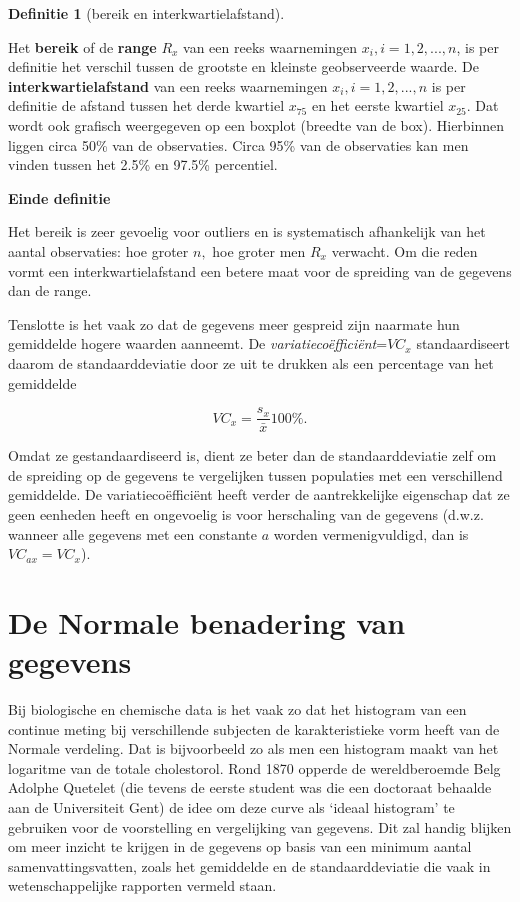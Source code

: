 \documentclass[
  12pt,dutch,coursenotes]{book}
\theoremstyle{definition}
\newtheorem{definition}{Definitie}[chapter]
\theoremstyle{definition}
\theoremstyle{definition}
\theoremstyle{definition}
\theoremstyle{remark}
\begin{document}
\begin{definition}[bereik en interkwartielafstand]
\protect\hypertarget{def:unnamed-chunk-103}{}{\label{def:unnamed-chunk-103} {} }
\end{definition}
Het \textbf{bereik} of de \textbf{range} \(R_x\) van een reeks waarnemingen \(x_i, i=1,2,...,n\), is per definitie het verschil tussen de grootste en
kleinste geobserveerde waarde. De \textbf{interkwartielafstand} van een
reeks waarnemingen \(x_i, i=1,2,...,n\) is per definitie de afstand tussen het derde kwartiel \(x_{75}\) en het eerste kwartiel \(x_{25}\). Dat wordt ook grafisch weergegeven op een boxplot (breedte van de box). Hierbinnen liggen circa 50\% van de observaties. Circa 95\% van de observaties kan men vinden tussen het 2.5\% en 97.5\% percentiel.

\textbf{Einde definitie}

Het bereik is zeer gevoelig voor outliers en is systematisch afhankelijk van
het aantal observaties: hoe groter \(n,\) hoe groter men \(R_x\) verwacht. Om
die reden vormt een interkwartielafstand een betere maat voor de spreiding
van de gegevens dan de range.

Tenslotte is het vaak zo dat de gegevens meer gespreid zijn naarmate hun
gemiddelde hogere waarden aanneemt. De \emph{variatiecoëfficiënt}=\(VC_x\)
standaardiseert daarom de standaarddeviatie door ze uit te drukken als een
percentage van het gemiddelde

\begin{equation*}
VC_x = \frac{s_x}{\bar{x}} 100\%.
\end{equation*}

Omdat ze gestandaardiseerd is, dient ze beter dan de standaarddeviatie zelf om de spreiding op de gegevens te vergelijken tussen populaties met een verschillend gemiddelde. De variatiecoëfficiënt heeft verder de aantrekkelijke eigenschap dat ze geen eenheden heeft en ongevoelig is
voor herschaling van de gegevens (d.w.z. wanneer alle gegevens met een
constante \(a\) worden vermenigvuldigd, dan is \(VC_{ax}=VC_x\)).

\hypertarget{sec:normal}{%
\section{De Normale benadering van gegevens}\label{sec:normal}}

Bij biologische en chemische data is het vaak zo dat het histogram van een continue
meting bij verschillende subjecten de karakteristieke vorm heeft van de
Normale verdeling. Dat is bijvoorbeeld zo als men een histogram maakt van het
logaritme van de totale cholestorol. Rond 1870 opperde de wereldberoemde
Belg Adolphe Quetelet (die tevens de eerste student was die een doctoraat behaalde aan de Universiteit
Gent) de idee om deze curve als `ideaal histogram' te gebruiken voor de
voorstelling en vergelijking van gegevens. Dit zal handig blijken om meer
inzicht te krijgen in de gegevens op basis van een minimum aantal
samenvattingsvatten, zoals het gemiddelde en de standaarddeviatie die vaak
in wetenschappelijke rapporten vermeld staan.
\end{document}
